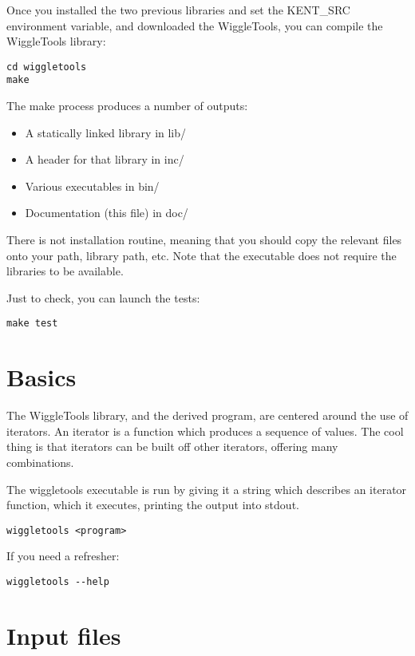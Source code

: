 \documentclass[12pt]{article}
\begin{document}
Once you installed the two previous libraries and set the KENT\_SRC environment variable, and downloaded the WiggleTools, you can compile the WiggleTools library:

\begin{verbatim}
cd wiggletools
make
\end{verbatim}

The make process produces a number of outputs:

\begin{itemize}
\item A statically linked library in lib/
\item A header for that library in inc/
\item Various executables in bin/
\item Documentation (this file) in doc/
\end{itemize}

There is not installation routine, meaning that you should copy the relevant files onto your path, library path, etc. Note that the executable does not require the libraries to be available.

Just to check, you can launch the tests:

\begin{verbatim}
make test
\end{verbatim}

\section{Basics}

The WiggleTools library, and the derived program, are centered around the use of iterators. An iterator is a function which produces a sequence of values. The cool thing is that iterators can be built off other iterators, offering many combinations. 

The wiggletools executable is run by giving it a string which describes an iterator function, which it executes, printing the output into stdout.

\begin{verbatim}
wiggletools <program>
\end{verbatim}

If you need a refresher:

\begin{verbatim}
wiggletools --help
\end{verbatim}

\section{Input files}
\end{document}
